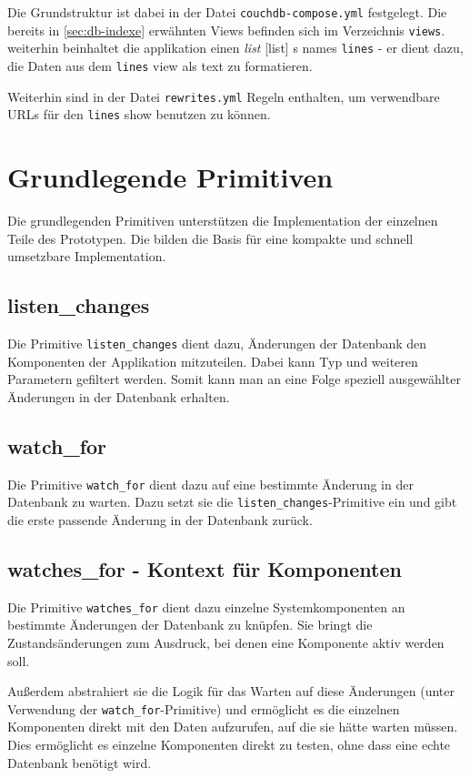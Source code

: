 Die Grundstruktur ist dabei in der Datei \verb|couchdb-compose.yml| festgelegt.
Die bereits in \cref{sec:db-indexe} erwähnten Views befinden sich im Verzeichnis \verb|views|.
weiterhin beinhaltet die applikation einen \emph{list} \cite{couchdb:guide}[list] s names \verb|lines| - er dient dazu, die Daten aus dem \verb|lines| view als text zu formatieren.

Weiterhin sind in der Datei \verb|rewrites.yml| Regeln enthalten, um verwendbare URLs für den \verb|lines| show benutzen zu können.

\section{Grundlegende Primitiven}

Die grundlegenden Primitiven unterstützen die Implementation der einzelnen Teile des Prototypen. Die bilden die Basis für eine kompakte und schnell umsetzbare Implementation.

\subsection{listen\_changes}

Die Primitive \verb|listen_changes| dient dazu,
Änderungen der Datenbank den Komponenten der Applikation mitzuteilen.
Dabei kann Typ und weiteren Parametern gefiltert werden.
Somit kann man an eine Folge speziell ausgewählter Änderungen in der Datenbank erhalten.

\subsection{watch\_for}

Die Primitive \verb|watch_for| dient dazu auf eine bestimmte Änderung in der Datenbank zu warten. Dazu setzt sie die \verb|listen_changes|-Primitive ein und gibt die erste passende Änderung in der Datenbank zurück.

\subsection{watches\_for - Kontext für Komponenten}

Die Primitive \verb|watches_for| dient dazu einzelne Systemkomponenten
an bestimmte Änderungen der Datenbank zu knüpfen.
Sie bringt die Zustandsänderungen zum Ausdruck,
bei denen eine Komponente aktiv werden soll.

Außerdem abstrahiert sie die Logik für das Warten auf diese Änderungen
(unter Verwendung der \verb|watch_for|-Primitive)
und ermöglicht es die einzelnen Komponenten direkt mit den Daten aufzurufen,
auf die sie hätte warten müssen.
Dies ermöglicht es einzelne Komponenten direkt zu testen, ohne dass eine echte Datenbank benötigt wird.

